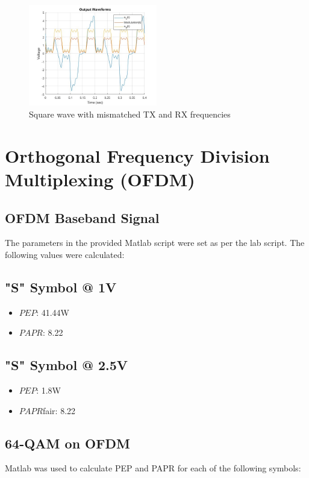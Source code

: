 \documentclass[a4paper, twocolumn]{article}
\begin{document}
        \begin{figure}[htbp]
        \centering

        \includegraphics[width=0.5\textwidth]{Images/AM_RX_1/Square Wave/Receiver Carrier Frequency Offset/Output Waveforms.jpg}
        \caption{Square wave with mismatched TX and RX frequencies }

        \end{figure}


        \section{Orthogonal Frequency Division Multiplexing (OFDM)}
        \subsection{OFDM Baseband Signal}
        The parameters in the provided Matlab script were set as per the lab script.
        The following values were calculated:
        \subsection*{"S" Symbol @ 1V}
        \begin{itemize}
            \item ${PEP}$: 41.44W
            \item ${PAPR}$: 8.22
        \end{itemize}

        \subsection*{"S" Symbol @ 2.5V}
        \begin{itemize}
            \item ${PEP}$: 1.8W
            \item ${PAPR}$fair: 8.22
        \end{itemize}

        \subsection{64-QAM on OFDM}
        Matlab was used to calculate PEP and PAPR for each of the following symbols:
\end{document}
